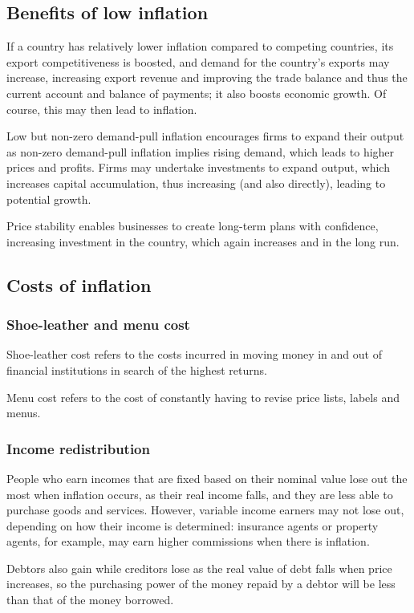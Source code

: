 \documentclass[Economics.tex]{subfiles}
\begin{document}
\subsection{Benefits of low inflation}
If a country has relatively lower inflation compared to competing countries, its export competitiveness is boosted, and demand for the country's exports may increase, increasing export revenue and improving the trade balance and thus the current account and balance of payments; it also boosts economic growth. Of course, this may then lead to inflation.

Low but non-zero demand-pull inflation encourages firms to expand their output as non-zero demand-pull inflation implies rising demand, which leads to higher prices and profits. Firms may undertake investments to expand output, which increases capital accumulation, thus increasing \AS{} (and also \AD{} directly), leading to potential growth.

Price stability enables businesses to create long-term plans with confidence, increasing investment in the country, which again increases \AD{} and \AS{} in the long run.
\subsection{Costs of inflation}
\subsubsection{Shoe-leather and menu cost}
Shoe-leather cost refers to the costs incurred in moving money in and out of financial institutions in search of the highest returns.

Menu cost refers to the cost of constantly having to revise price lists, labels and menus.
\subsubsection{Income redistribution}
People who earn incomes that are fixed based on their nominal value lose out the most when inflation occurs, as their real income falls, and they are less able to purchase goods and services. However, variable income earners may not lose out, depending on how their income is determined: insurance agents or property agents, for example, may earn higher commissions when there is inflation.

Debtors also gain while creditors lose as the real value of debt falls when price increases, so the purchasing power of the money repaid by a debtor will be less than that of the money borrowed.
\end{document}
